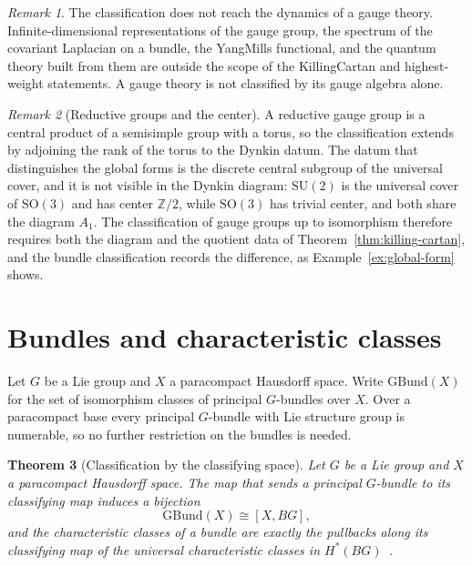 \documentclass[11pt,letterpaper]{article}
\newtheorem{theorem}{Theorem}[section]
\theoremstyle{definition}
\theoremstyle{remark}
\newtheorem{remark}[theorem]{Remark}
\begin{document}
\begin{remark}
The classification does not reach the dynamics of a gauge theory. Infinite-dimensional representations of the gauge group, the spectrum of the covariant Laplacian on a bundle, the Yang\textendash{}Mills functional, and the quantum theory built from them are outside the scope of the Killing\textendash{}Cartan and highest-weight statements. A gauge theory is not classified by its gauge algebra alone.
\end{remark}

\begin{remark}[Reductive groups and the center]
\label{rem:reductive}
A reductive gauge group is a central product of a semisimple group with a torus, so the classification extends by adjoining the rank of the torus to the Dynkin datum. The datum that distinguishes the global forms is the discrete central subgroup of the universal cover, and it is not visible in the Dynkin diagram: $\mathrm{SU}(2)$ is the universal cover of $\mathrm{SO}(3)$ and has center $\mathbb{Z}/2$, while $\mathrm{SO}(3)$ has trivial center, and both share the diagram $A_1$. The classification of gauge groups up to isomorphism therefore requires both the diagram and the quotient data of Theorem~\ref{thm:killing-cartan}, and the bundle classification records the difference, as Example~\ref{ex:global-form} shows.
\end{remark}

\section{Bundles and characteristic classes}
\label{sec:bundles}

Let $G$ be a Lie group and $X$ a paracompact Hausdorff space. Write $\mathrm{GBund}(X)$ for the set of isomorphism classes of principal $G$-bundles over $X$. Over a paracompact base every principal $G$-bundle with Lie structure group is numerable, so no further restriction on the bundles is needed.

\begin{theorem}[Classification by the classifying space]
\label{thm:bundles}
Let $G$ be a Lie group and $X$ a paracompact Hausdorff space. The map that sends a principal $G$-bundle to its classifying map induces a bijection~\cite{milnor, dold, steenrod}
\[
\mathrm{GBund}(X) \cong [X, BG],
\]
and the characteristic classes of a bundle are exactly the pullbacks along its classifying map of the universal characteristic classes in $H^*(BG)$~\cite{milnor-stasheff}.
\end{theorem}
\end{document}
